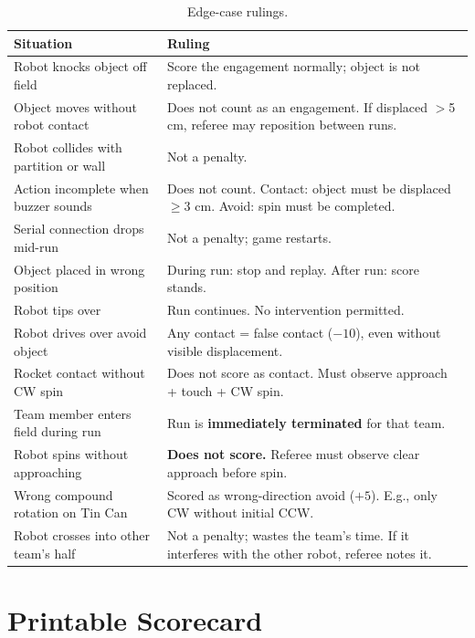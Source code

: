 \documentclass[a4]{article}
\begin{document}
\begin{table}[H]
\centering
\small
\begin{tabular}{p{5.5cm}p{8.5cm}}
\toprule
\textbf{Situation} & \textbf{Ruling} \\
\midrule
Robot knocks object off field & Score the engagement normally; object is not replaced. \\
Object moves without robot contact & Does not count as an engagement. If displaced $>$5 cm, referee may reposition between runs. \\
Robot collides with partition or wall & Not a penalty. \\
Action incomplete when buzzer sounds & Does not count. Contact: object must be displaced $\geq$3 cm. Avoid: spin must be completed. \\
Serial connection drops mid-run & Not a penalty; game restarts. \\
Object placed in wrong position & During run: stop and replay. After run: score stands. \\
Robot tips over & Run continues. No intervention permitted. \\
Robot drives over avoid object & Any contact = false contact ($-10$), even without visible displacement. \\
Rocket contact without CW spin & Does not score as contact. Must observe approach + touch + CW spin. \\
Team member enters field during run & Run is \textbf{immediately terminated} for that team. \\
Robot spins without approaching & \textbf{Does not score.} Referee must observe clear approach before spin. \\
Wrong compound rotation on Tin Can & Scored as wrong-direction avoid ($+5$). E.g., only CW without initial CCW. \\
Robot crosses into other team's half & Not a penalty; wastes the team's time. If it interferes with the other robot, referee notes it. \\
\bottomrule
\end{tabular}
\caption{Edge-case rulings.}
\end{table}

\pagebreak
\section{Printable Scorecard}
\end{document}
